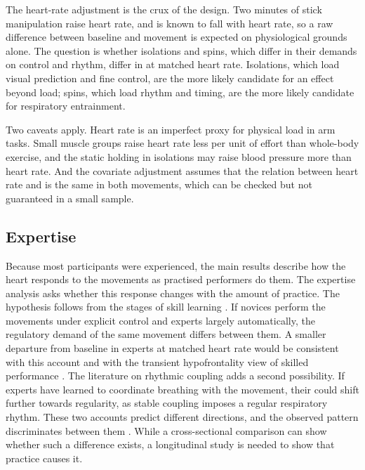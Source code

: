 The heart-rate adjustment is the crux of the design. Two minutes of stick manipulation raise heart rate, and \al{} is known to fall with heart rate, so a raw difference between baseline and movement is expected on physiological grounds alone. The question is whether isolations and spins, which differ in their demands on control and rhythm, differ in \al{} at matched heart rate. Isolations, which load visual prediction and fine control, are the more likely candidate for an effect beyond load; spins, which load rhythm and timing, are the more likely candidate for respiratory entrainment. 

Two caveats apply. Heart rate is an imperfect proxy for physical load in arm tasks. Small muscle groups raise heart rate less per unit of effort than whole-body exercise, and the static holding in isolations may raise blood pressure more than heart rate. And the covariate adjustment assumes that the relation between heart rate and \al{} is the same in both movements, which can be checked but not guaranteed in a small sample.

\subsection{Expertise}
\label{sec:disc-expertise}


Because most participants were experienced, the main results describe how the heart responds to the movements as practised performers do them. The expertise analysis asks whether this response changes with the amount of practice. The hypothesis follows from the stages of skill learning \citep{fitts1967}. If novices perform the movements under explicit control and experts largely automatically, the regulatory demand of the same movement differs between them. A smaller departure from baseline \al{} in experts at matched heart rate would be consistent with this account and with the transient hypofrontality view of skilled performance \citep{dietrich2004}. The literature on rhythmic coupling adds a second possibility. If experts have learned to coordinate breathing with the movement, their \al{} could shift further towards regularity, as stable coupling imposes a regular respiratory rhythm. These two accounts predict different directions, and the observed pattern discriminates between them . While a cross-sectional comparison can show whether such a difference exists, a longitudinal study is needed to show that practice causes it.

